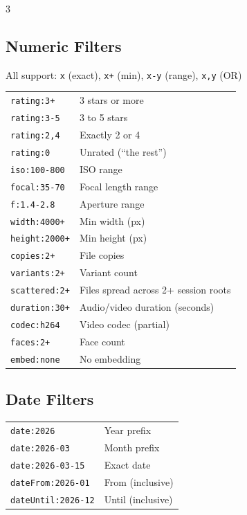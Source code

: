 \documentclass[a4paper,landscape,8pt]{article}
\newcommand{\cmd}[1]{\texttt{\footnotesize #1}}
\begin{document}
\begin{multicols}{3}
\subsection{Numeric Filters}
All support: \cmd{x} (exact), \cmd{x+} (min), \cmd{x-y} (range), \cmd{x,y} (OR)
\begin{tabularx}{\columnwidth}{@{}lX@{}}
\cmd{rating:3+} & 3 stars or more \\
\cmd{rating:3-5} & 3 to 5 stars \\
\cmd{rating:2,4} & Exactly 2 or 4 \\
\cmd{rating:0} & Unrated (``the rest'') \\
\cmd{iso:100-800} & ISO range \\
\cmd{focal:35-70} & Focal length range \\
\cmd{f:1.4-2.8} & Aperture range \\
\cmd{width:4000+} & Min width (px) \\
\cmd{height:2000+} & Min height (px) \\
\cmd{copies:2+} & File copies \\
\cmd{variants:2+} & Variant count \\
\cmd{scattered:2+} & Files spread across 2+ session roots \\
\cmd{duration:30+} & Audio/video duration (seconds) \\
\cmd{codec:h264} & Video codec (partial) \\
\cmd{faces:2+} & Face count \\
\cmd{embed:none} & No embedding \\
\end{tabularx}

\subsection{Date Filters}
\begin{tabularx}{\columnwidth}{@{}lX@{}}
\cmd{date:2026} & Year prefix \\
\cmd{date:2026-03} & Month prefix \\
\cmd{date:2026-03-15} & Exact date \\
\cmd{dateFrom:2026-01} & From (inclusive) \\
\cmd{dateUntil:2026-12} & Until (inclusive) \\
\end{tabularx}


\end{multicols}
\end{document}
